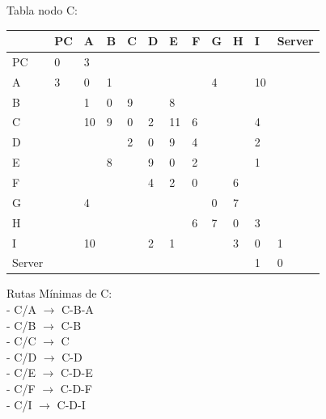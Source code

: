 \documentclass[a4paper]{article}
\begin{document}
\begin{table}[ht]
Tabla nodo C:\\
\begin{tabular}{|l|l|l|l|l|l|l|l|l|l|l|l|}
\hline
       & PC & A  & B & C & D & E  & F & G & H & I  & Server \\ \hline
PC     & 0  & 3  &   &   &   &    &   &   &   &    &        \\ \hline
A      & 3  & 0  & 1 &   &   &    &   & 4 &   & 10 &        \\ \hline
B      &    & 1  & 0 & 9 &   & 8  &   &   &   &    &        \\ \hline
C      &    & 10 & 9 & 0 & 2 & 11 & 6 &   &   & 4  &        \\ \hline
D      &    &    &   & 2 & 0 & 9  & 4 &   &   & 2  &        \\ \hline
E      &    &    & 8 &   & 9 & 0  & 2 &   &   & 1  &        \\ \hline
F      &    &    &   &   & 4 & 2  & 0 &   & 6 &    &        \\ \hline
G      &    & 4  &   &   &   &    &   & 0 & 7 &    &        \\ \hline
H      &    &    &   &   &   &    & 6 & 7 & 0 & 3  &        \\ \hline
I      &    & 10 &   &   & 2 & 1  &   &   & 3 & 0  & 1      \\ \hline
Server &    &    &   &   &   &    &   &   &   & 1  & 0      \\ \hline
\end{tabular}

Rutas Mínimas de C:\\
-	C/A  $\rightarrow$  C-B-A\\
-	C/B  $\rightarrow$  C-B\\
-	C/C  $\rightarrow$  C\\
-	C/D  $\rightarrow$  C-D\\
-	C/E  $\rightarrow$  C-D-E\\
-	C/F  $\rightarrow$  C-D-F\\
-	C/I  $\rightarrow$ C-D-I\\
\end{table}

\clearpage
\end{document}
